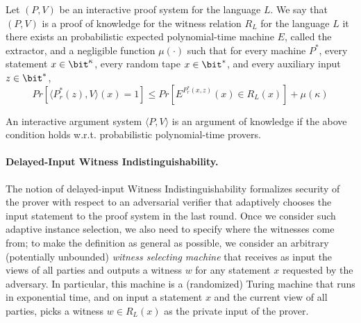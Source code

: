  Let $(P, V )$ be an interactive proof system for the language
$L$. We say that $(P, V )$ is a proof of knowledge for the witness relation $R_L$ for the language $L$ it there
exists an probabilistic expected polynomial-time machine $E$, called the extractor, and a negligible
function $\mu(\cdot)$ such that for every machine $P^*$, every statement $x \in \bit^\kappa$, every random tape
$x \in \bit^*$, and every auxiliary input $z \in \bit^*$,
$$Pr [ \langle P^*_r(z), V \rangle(x) = 1]\leq Pr[E^{P^*_r(x,z)}(x) \in R_L(x)] + \mu(\kappa)$$
\ED

An interactive argument system $\langle P, V \rangle$ is an
argument of knowledge if the above condition holds w.r.t.
probabilistic polynomial-time provers.

\iffalse
  \paragraph{Special-sound WI proofs.} A $4$-round public-coin
  interactive proof for the language $L \in \NP$ with witness relation
  $R_L$ is special-sound with respect to $R_L$, if for any two
  transcripts $(\delta,\alpha,\beta, \gamma)$ and
  $(\delta',\alpha',\beta', \gamma')$ such that the initial two
  messages, $(\delta,\delta')$ and $(\alpha,\alpha')$ are the same
  but the challenges $(\beta,\beta')$ are different, there is a
  deterministic procedure to extract the witness from the two
  transcripts and runs in polynomial time.
\fi

\paragraph{Delayed-Input Witness Indistinguishability.}
The notion of delayed-input Witness Indistinguishability formalizes security of the prover with respect to an adversarial
verifier that adaptively chooses the input statement to the proof system in the last round. Once we
consider such adaptive instance selection, we also need to specify where the
witnesses come from; to make the definition as general as
possible, we consider an arbitrary (potentially unbounded) \emph{witness selecting
machine} that receives as input the views of all parties and outputs a witness $w$ for any statement
$x$ requested by the adversary. In particular, this machine is a (randomized) Turing
machine that runs in exponential time, and on input a
statement $x$ and the current
view of all parties, picks
a witness $w \in R_L(x)$ as the private input of the prover.

